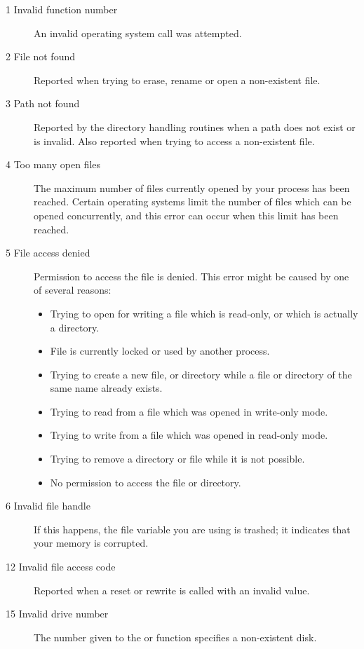 \begin{description}
\item [1  Invalid function number]
An invalid operating system call was attempted.

\item [2  File not found]
Reported when trying to erase, rename or open a non-existent
file.

\item [3  Path not found]
Reported by the directory handling routines when a path does not 
exist or is invalid. Also reported when trying to access a 
non-existent file.

\item [4  Too many open files]
The maximum number of files currently opened by your process
has been reached. Certain operating systems limit the number
of files which can be opened concurrently, and this error
can occur when this limit has been reached.

\item [5  File access denied]
Permission to access the file is denied. This error might
be caused by one of several reasons:
\begin{itemize}
\item Trying to open for writing a file which is
read-only, or which is actually a directory.
\item File is currently locked or used by another process.
\item Trying to create a new file, or directory while a 
file or directory of the same name already exists.
\item Trying to read from a file which was opened in write-only mode.
\item Trying to write from a file which was opened in read-only mode.
\item Trying to remove a directory or file while it is not possible.
\item No permission to access the file or directory.        
\end{itemize}

\item [6  Invalid file handle]
If this happens, the file variable you are using is trashed; it
indicates that your memory is corrupted.

\item [12  Invalid file access code]
Reported when a reset or rewrite is called with an invalid 
value.

\item [15  Invalid drive number]
The number given to the  or  function specifies a 
non-existent disk.


\end{description}
